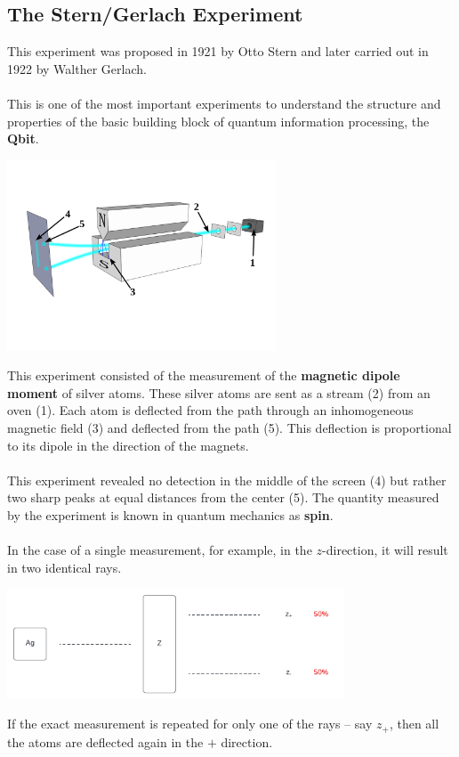 \documentclass{article}
\begin{document}
\subsection{The Stern/Gerlach Experiment}
This experiment was proposed in 1921 by Otto Stern and later carried out in 1922 by Walther Gerlach. \\ \\
This is one of the most important experiments to understand the structure and properties of the basic building block of quantum information processing, the \textbf{Qbit}.

\begin{center}
	\includegraphics[width=8cm]{assets/stern_gerlach.png}
\end{center}
This experiment consisted of the measurement of the \textbf{magnetic dipole moment} of silver atoms. These silver atoms are sent as a stream (2) from an oven (1). Each atom is deflected from the path through an inhomogeneous magnetic field (3) and deflected from the path (5). This deflection is proportional to its dipole in the direction of the magnets. \\ \\
This experiment revealed no detection in the middle of the screen (4) but rather two sharp peaks at equal distances from the center (5). The quantity measured by the experiment is known in quantum mechanics as \textbf{spin}. \\ \\
In the case of a single measurement, for example, in the $z$-direction, it will result in two identical rays.

\begin{center}
	\includegraphics[width=10cm]{assets/one_z_measurement.pdf}
\end{center}
If the exact measurement is repeated for only one of the rays -- say $z_+$, then all the atoms are deflected again in the $+$ direction.
\end{document}

